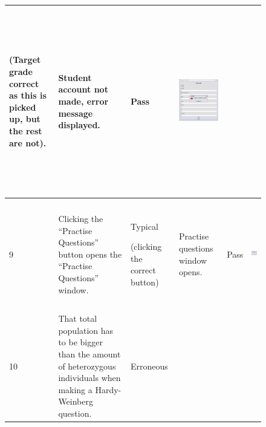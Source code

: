 \documentclass[letterpaper]{article}
\begin{document}
\begin{figure}[hbp]
\begin{minipage}{12.1146in}
\begin{flushleft}
\begin{supertabular}{|m{0.8913598in}|m{1.0997599in}|m{3.3018599in}|m{0.8809598in}|m{0.6198598in}|m{4.84626in}|}
{\color{black} (Target grade correct as this is picked up, but the rest are not).} &
{\color{black} Student account not made, error message displayed.} &
{\color{black} Pass} &
 \includegraphics[width=2.9898in,height=3.1874in]{Tests_files/image014.jpg} \\\hline
{\color{black} 9} &
{\color{black} Clicking the ``Practise Questions'' button opens the ``Practise Questions'' window.} &
{\color{black} Typical}

{\color{black} (clicking the correct button)} &
{\color{black} Practise questions window opens.} &
{\color{black} Pass} &
 \includegraphics[width=2.3646in,height=1.8543in]{Tests_files/image015.jpg} \\\hline
{\color{black} 10} &
{\color{black} That total population has to be bigger than the amount of heterozygous individuals when making a
Hardy-Weinberg question.} &
{\color{black} Erroneous}


\end{supertabular}
\end{flushleft}
\end{minipage}
\end{figure}
\end{document}
